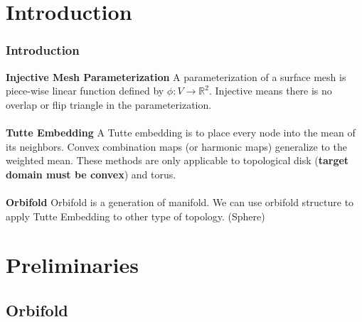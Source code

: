 \documentclass{beamer}
\begin{document}
\section{Introduction} %
\begin{frame}
\frametitle{Introduction}
\textbf{Injective Mesh Parameterization} 
A parameterization of a surface mesh is piece-wise linear function defined by $\phi:V\rightarrow \mathbb{R}^2$. Injective means there is no overlap or flip triangle in the parameterization.\\
~\\
\textbf{Tutte Embedding}
A Tutte embedding is to place every node into the mean of its neighbors. Convex combination maps (or harmonic maps) generalize to the weighted mean. These methods are only applicable to topological disk (\textbf{target domain must be convex}) and torus.\\
~\\
\textbf{Orbifold}
Orbifold is a generation of manifold. We can use orbifold structure to apply Tutte Embedding to other type of topology. (Sphere)
\end{frame}


\section{Preliminaries} %
\subsection{Orbifold}

\end{document}
